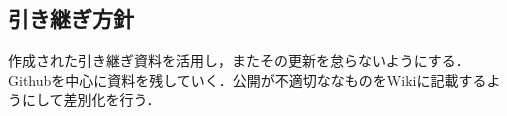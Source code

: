 \subsection*{引き継ぎ方針}


作成された引き継ぎ資料を活用し，またその更新を怠らないようにする．
Githubを中心に資料を残していく．公開が不適切ななものをWikiに記載するようにして差別化を行う．